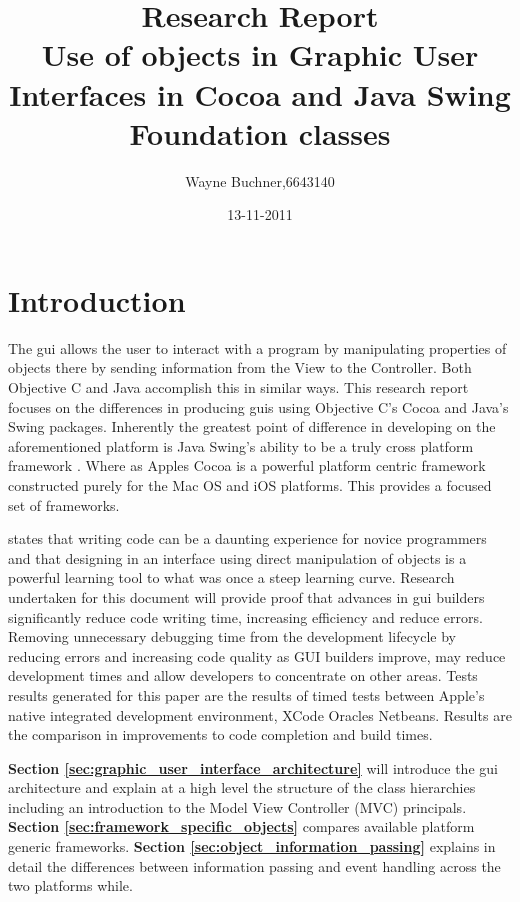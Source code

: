 \documentclass[a4paper,14pt]{article}
\title{Research Report\\Use of objects in Graphic User Interfaces in Cocoa and Java Swing Foundation classes}
\author{Wayne Buchner,6643140}
\date{13-11-2011}
\begin{document}
\ifpdf
{}
\else
{}
\fi

\maketitle
\thispagestyle{empty}
\newpage
\tableofcontents
\newpage

\section{Introduction} %
\label{sec:introduction}
The \gls{gui} allows the user to interact with a program by manipulating properties of objects there by sending information from the View to the Controller. Both Objective C and Java accomplish this in similar ways. This research report focuses on the differences in producing \gls{gui}s using Objective C's Cocoa and Java's Swing packages. Inherently the greatest point of difference in developing on the aforementioned platform is Java Swing's ability to be a truly cross platform framework \cite{nla.cat-vn3060178}. Where as Apples Cocoa is a powerful platform centric framework constructed purely for the Mac OS and iOS platforms. This provides a focused set of frameworks. 

%
 states that writing code can be a daunting experience for novice programmers and that designing in an interface using direct manipulation of objects is a powerful learning tool to what was once a steep learning curve. Research undertaken for this document will provide proof that advances in \gls{gui} builders significantly reduce code writing time, increasing efficiency and reduce errors. Removing unnecessary debugging time from the development lifecycle by reducing errors and increasing code quality as GUI builders improve, may reduce development times and allow developers to concentrate on other areas. Tests results generated for this paper are the results of timed tests between Apple's native integrated development environment, XCode Oracles Netbeans. Results are the comparison in improvements to code completion and build times.  
%

\textbf{Section \ref{sec:graphic_user_interface_architecture}} will introduce the \gls{gui} architecture and explain at a high level the structure of the class hierarchies including an introduction to the Model View Controller (MVC) principals. \textbf{Section \ref{sec:framework_specific_objects}} compares available platform generic frameworks. \textbf{Section \ref{sec:object_information_passing}} explains in detail the differences between information passing and event handling across the two platforms while.
\end{document}
